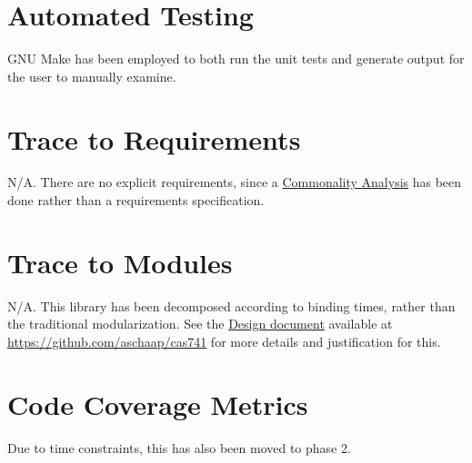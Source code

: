 \documentclass[12pt, titlepage]{article}
\begin{document}
\section{Automated Testing}
GNU Make has been employed to both run the unit tests and generate output for 
the user to manually examine.

\section{Trace to Requirements}
N/A. There are no explicit requirements, since a 
\href{../SRS/CA.pdf}{Commonality Analysis} has been done rather than a 
requirements specification.

\section{Trace to Modules}
N/A. This library has been decomposed according to binding times, rather than 
the traditional modularization. See the \href{../Design/Design.pdf}{Design 
document} available at \url{https://github.com/aschaap/cas741} for more details 
and justification for this.

\section{Code Coverage Metrics}
Due to time constraints, this has also been moved to phase 2.




\end{document}
